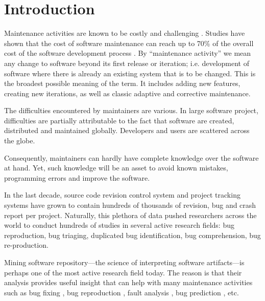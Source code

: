 
\setcounter{page}{1}

\chapter{Introduction}

Maintenance activities are known to be costly and challenging \cite{Pressman2005}. Studies have shown that the cost of software maintenance can reach up to 70\% of the overall cost of the software development process \cite{HealthSocial2002}.
By ``maintenance activity'' we mean any change to software beyond its first release or iteration; i.e. development of software where there is already an existing system that is to be changed.
This is the broadest possible meaning of the term.
It includes adding new features, creating new iterations, as well as classic adaptive and corrective maintenance.

The difficulties encountered by maintainers are various.
In large software project, difficulties are partially attributable to the fact that software are created, distributed and maintained globally.
Developers and users are scattered across the globe.

Consequently, maintainers can hardly have complete knowledge over the software at hand.
Yet, such knowledge will be an asset to avoid known mistakes, programming errors and improve the software.

In the last decade, source code revision control system and project tracking systems have grown to contain hundreds of thousands of revision, bug and crash report per project.
Naturally, this plethora of data pushed researchers across the world to conduct hundreds of studies in several active research fields: bug reproduction, bug triaging, duplicated bug identification, bug comprehension, bug re-production.

Mining software repository---the science of interpreting software artifacts---is perhaps one of the most active research field today.
The reason is that their analysis provides useful insight that can help with many maintenance activities such as bug fixing \cite{Weiss2007,Saha2014}, bug reproduction \cite{Artzi2008,Jin2012,Chen2013}, fault analysis \cite{Jiang2012,Jin2013}, bug prediction \cite{Hovemeyer2007}, etc.

